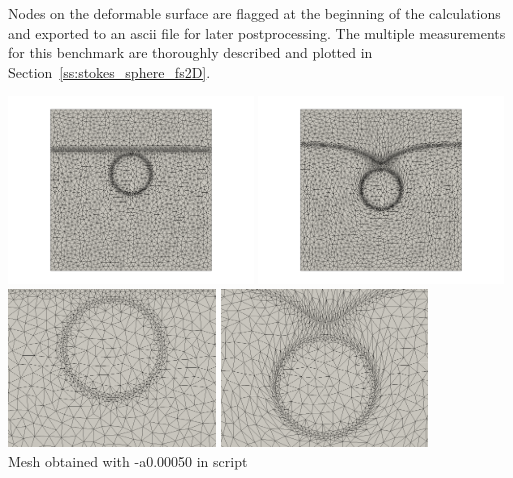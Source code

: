 Nodes on the deformable surface are flagged at the beginning of the calculations and 
exported to an ascii file for later postprocessing. The multiple measurements for this 
benchmark are thoroughly described and plotted in Section~\ref{ss:stokes_sphere_fs2D}.


\begin{center}
\includegraphics[width=6.5cm]{python_codes/fieldstone_93/50/mesh0000}
\includegraphics[width=6.5cm]{python_codes/fieldstone_93/50/mesh0136}\\
\includegraphics[width=5.5cm]{python_codes/fieldstone_93/50/meshzoom0000}
\includegraphics[width=5.5cm]{python_codes/fieldstone_93/50/meshzoom0136}\\
{\captionfont  Mesh obtained with -a0.00050 in script}
\end{center}

